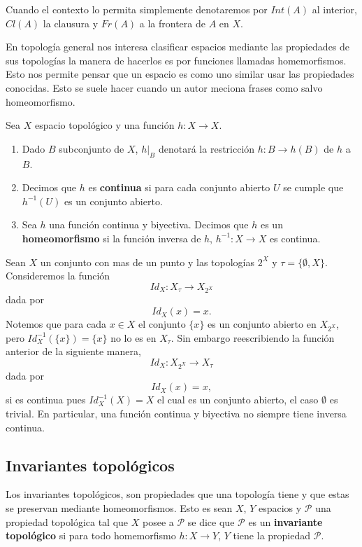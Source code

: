 \begin{cn}
Cuando el contexto lo permita simplemente denotaremos por $Int(A)$ al interior, $Cl(A)$ la clausura y  $Fr(A)$ a la frontera de $A$ en $X$.
\end{cn}


En topología general nos interesa clasificar espacios mediante las propiedades de sus topologías la manera de hacerlos es por funciones llamadas homemorfismos. Esto nos permite pensar que un espacio es como uno similar usar las propiedades conocidas. Esto se suele hacer cuando un autor meciona frases como salvo homeomorfismo.

\begin{df}
Sea $X$ espacio topológico y una función $h:X \to X$. 
\begin{enumerate}

	\item Dado $B$ subconjunto de $X$, $h|_B$ denotará la restricción $h:B \to h(B)$ de $h$ a $B$. 
	
	\item  Decimos que $h$ es \textbf{continua} si para cada conjunto abierto $U$ se cumple que $h^{-1}(U)$ es un conjunto abierto.
	
	\item  Sea $h$ una función continua y biyectiva. Decimos que $h$ es un \textbf{homeomorfismo} si la función inversa de $h$, $h^{-1}:X \to X$ es continua. 	
\end{enumerate}
\end{df}


\begin{ej}
Sean $X$ un conjunto con mas de un punto y las topologías $2^X$ y $\tau=\{\emptyset, X\}$. Consideremos la función $$Id_X:X_{\tau} \to X_{2^X}$$ dada por $$Id_X(x)=x.$$
Notemos que para cada $x \in X$ el conjunto $\{x\}$ es un conjunto abierto en $X_{2^X}$, pero $Id_X^{-1}(\{x\})= \{x\}$ no lo es en $X_\tau$. Sin embargo reescribiendo  la función anterior de la siguiente manera,  $$Id_X:X_{2^X} \to X_{\tau}$$ dada por $$Id_X(x)=x,$$
si es continua pues $Id_X^{-1}(X)=X$ el cual es un conjunto abierto, el caso $\emptyset$ es trivial. En particular, una función continua y biyectiva no siempre tiene inversa continua. 
\end{ej}

\subsection*{Invariantes topológicos}

Los invariantes topológicos, son propiedades que una topología tiene y que estas se preservan mediante homeomorfismos. Esto es sean $X$, $Y$ espacios y $\mathcal{P}$ una propiedad topológica tal que $X$ posee a $\mathcal{P}$ se dice que $\mathcal{P}$ es un \textbf{invariante topológico} si para todo homemorfismo $h:X \to Y$,  $Y$ tiene la propiedad $\mathcal{P}$.


